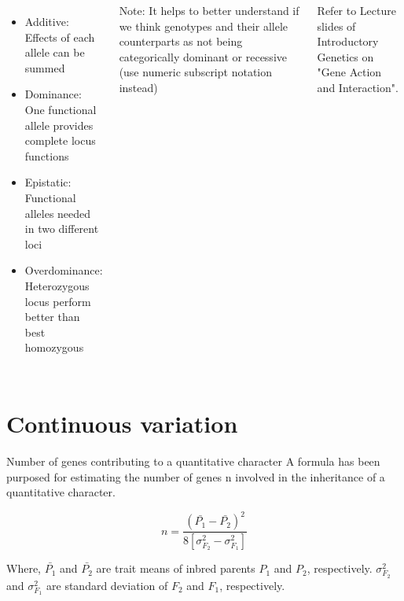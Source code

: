 \documentclass[11pt,ignorenonframetext,aspectratio=169]{beamer}
\begin{document}
\begin{frame}{}
\begin{columns}[T,onlytextwidth,c]

\begin{itemize}
\footnotesize
\item Additive: Effects of each allele can be summed
\item Dominance: One functional allele provides complete locus functions
\item Epistatic: Functional alleles needed in two different loci
\item Overdominance: Heterozygous locus perform better than best homozygous
\end{itemize}

\scriptsize Note: It helps to better understand if we think genotypes and their allele counterparts as not being categorically dominant or recessive (use numeric subscript notation instead)

\scriptsize Refer to Lecture slides of Introductory Genetics on "Gene Action and Interaction".

\end{columns}
\end{frame}

\hypertarget{continuous-variation}{%
\section{Continuous variation}\label{continuous-variation}}

\begin{frame}{Number of genes contributing to a quantitative character}
\protect\hypertarget{number-of-genes-contributing-to-a-quantitative-character}{}
A formula has been purposed for estimating the number of genes n
involved in the inheritance of a quantitative character.

\[n = \frac{(\bar{P_1} -\bar{P_2})^2}{8[\sigma_{F_2}^2-\sigma_{F_1}^2]}\]

Where, \(\bar{P_1}\) and \(\bar{P_2}\) are trait means of inbred parents
\(P_1\) and \(P_2\), respectively. \(\sigma_{F_2}^2\) and
\(\sigma_{F_1}^2\) are standard deviation of \(F_2\) and \(F_1\),
respectively.
\end{frame}
\end{document}
